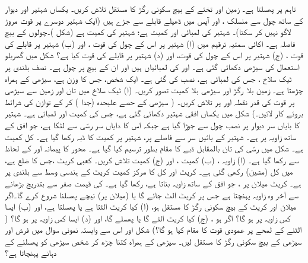 تاہم   پر پھسلتا ہے۔ زمین اور تختے کے بیچ سکونی رگڑ کا مستقل تلاش کریں۔
یکساں شہتیر  اور  دیوار کے ساتھ چول سے منسلک ، اور آپس میں ڈھیلے قابلے سے جڑے ہیں (ایک شہتیر دوسرے پر قوت مروڑ لاگو نہیں کر سکتا)۔ شہتیر  کی لمبائی  اور کمیت  ہے؛ شہتیر   کی 
کمیت  ہے (شکل )۔چولوں کے بیچ فاصلہ  ہے۔ اکائی سمتیہ ترقیم میں  (ا) شہتیر  پر اس کے چول کی قوت ، اور (ب) شہتیر  پر قابلے کی قوت ، (ج)  شہتیر  پر اس کے چول کی قوت، اور (د) شہتیر  پر قابلے کی قوت کیا ہے؟
شکل   میں   گھریلو استعمال کی سیڑھی دکھائی گئی ہے۔    اور  کی لمبائیاں  ہیں  اور  ان کے بیچ  پر  چول ہے۔ نصف بلندی پر  ٹیک سلاخ ، جس کی لمبائی  ہے، نصب کی گئی ہے۔ ایک شخص، جس کا وزن  ہے، سیڑھی کے ہمراہ  چڑھتا ہے۔ زمین بلا رگڑ اور سیڑھی بلا کمیت  تصور کریں۔ (ا) ٹیک سلاخ میں تان  اور زمین سے سیڑھی پر قوت کی قدر نقطہ  اور  پر تلاش کریں۔ ( سیڑھی کے حصے علیحدہ (جدا ) کر کے توازن کی  شرائط   بروئے کار لائیں۔)
شکل  میں یکساں افقی شہتیر دکھائی گئی ہے، جس کی کمیت  اور لمبائی  ہے۔ شہتیر کا بایاں سر دیوار پر نصب چول سے جوڑا گیا ہے جبکہ اس کا دایاں سر رسّی سے لٹکا ہے، جو افق کے ساتھ زاویہ  پر ہے۔ شہتیر کے بائیں سر سے  فاصلے پر، شہتیر پر  کمیت کا ڈبہ رکھا گیا ہے۔ کل کمیت  ہے۔ شکل  میں  رسّی کی  تان   بالمقابل ڈبے کا مقام بطور  ترسیم کیا گیا ہے۔  محور  کا پیمانہ   اور  کے لحاظ سے رکھا گیا ہے۔ (ا) زاویہ ، (ب) کمیت ، اور (ج) کمیت  تلاش کریں۔
کعبی کریٹ ،جس کا ضلع  ہے،  میں کل (مشین)  رکھی گئی ہے۔ کریٹ اور کل کا مرکز کمیت  کریٹ کے ہندسی وسط  
سے  بلندی پر ہے۔ کریٹ  میلان پر ، جو افق کے ساتھ  زاویہ بناتا ہے، رکھا گیا ہے۔  کی قیمت صفر سے بتدریج بڑھانے سے آخر     وہ زاویہ پہنچتا  ہے جس پر کریٹ  الٹ جائے  گا یا  (میلان پر) نیچے   پھسلنا شروع کرے گا۔اگر میلان  اور کریٹ کے بیچ  سکونی رگڑ کا مستقل  ہو، (ا)  کیا کریٹ الٹتا ہے یا پھسلتا ہے، اور (ب) ایسا کس زاویہ  پر ہو گا؟ اگر  ہو ، (ج) کیا کریٹ الٹے گا یا پھسلے گا، اور (د) ایسا کس زاویہ  پر ہو گا؟ ( الٹنے کے لمحے پر عمودی قوت کا مقام کیا ہو گا؟)
شکل  اور اس سے وابستہ نمونی سوال  میں فرش اور سیڑھی  کے بیچ سکونی رگڑ کا مستقل  لیں۔ سیڑھی کے ہمراہ کتنا چڑھ کر  شخص سیڑھی کو پھسلنے کے دہانے  پہنچاتا ہے؟

